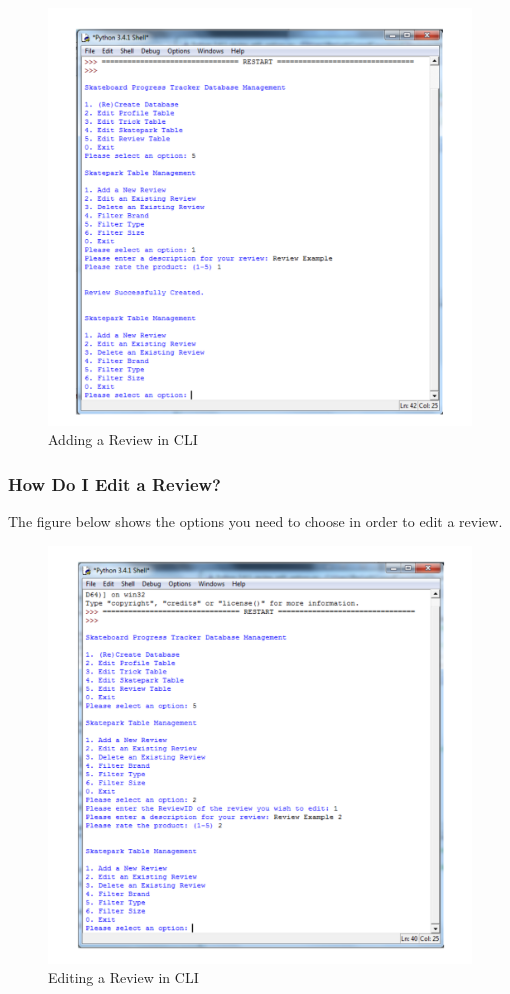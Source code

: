 \begin{figure}[H]
    \includegraphics[width=\textwidth]{./Manual/Images/AddReview.pdf}
    \caption{Adding a Review in CLI} \label{fig:Add Review}
\end{figure}



\subsubsection{How Do I Edit a Review?}

The figure below shows the options you need to choose in order to edit a review.

\begin{figure}[H]
    \includegraphics[width=\textwidth]{./Manual/Images/EditReview.pdf}
    \caption{Editing a Review in CLI} \label{fig:Edit Review}
\end{figure}



